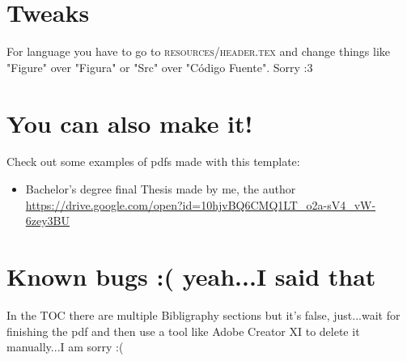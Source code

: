 \documentclass[11pt,openright,a4paper,english]{book} %
\begin{document}
\section{Tweaks}

For language you have to go to \textsc{resources/header.tex} and change things like "Figure" over "Figura" or "Src" over "Código Fuente". Sorry :3

\section{You can also make it!}

Check out some examples of pdfs made with this template:
\begin{itemize}
\item Bachelor's degree final Thesis made by me, the author \\ \url{https://drive.google.com/open?id=10hjvBQ6CMQ1LT_o2a-sV4_vW-6zey3BU}
\end{itemize}


\section{Known bugs :( yeah...I said that}

In the TOC there are multiple Bibligraphy sections but it's false, just...wait for finishing the pdf and then use a tool like Adobe Creator XI to delete it manually...I am sorry :(























\cleardoublepage
\listoftables

\cleardoublepage
\listoffigures

\cleardoublepage
\listofsourcecodes


\cleardoublepage
\listofreferences










\end{document}
